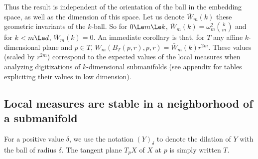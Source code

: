 Thus the result is independent of the orientation of the ball in the
embedding space, as well as the dimension of this space. Let us denote
$\bar{W}_{m}(k)$ these geometric invariants of the $k$-ball. So for $0
\Le m \Le k$, $\bar{W}_{m}(k)=\omega_m^2\binom{k}{m}$ and for $k < m
\Le d$, $\bar{W}_{m}(k)=0$.  An immediate corollary is that, for $T$
any affine $k$-dimensional plane and $p \in T$, $W_m( B_T(p,r),p,r) =
\bar{W}_{m}(k) r^{2m}$.  These values (scaled by $r^{2m}$) correspond
to the expected values of the local measures when analyzing
digitizations of $k$-dimensional submanifolds (see appendix for tables
expliciting their values in low dimension).





\subsection{Local measures are stable in a neighborhood of a submanifold}

For a positive value $\delta$, we use the notation $(Y)_\delta$ to
denote the dilation of $Y$ with the ball of radius $\delta$. The
tangent plane $T_p X$ of $X$ at $p$ is simply written $T$.

\begin{figure}
  
\end{figure}

